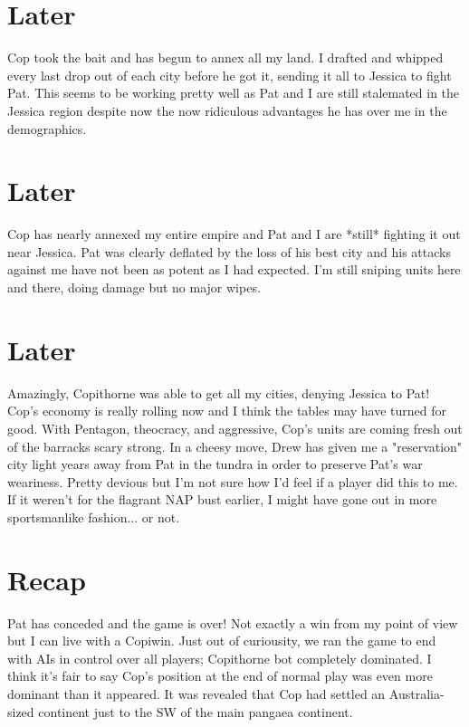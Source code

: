 \documentclass[10pt]{article}
\begin{document}
\section*{Later}

Cop took the bait and has begun to annex all my land. I drafted and
whipped every last drop out of each city before he got it, sending it
all to Jessica to fight Pat. This seems to be working pretty well as
Pat and I are still stalemated in the Jessica region despite now the
now ridiculous advantages he has over me in the demographics.

\section*{Later}

Cop has nearly annexed my entire empire and Pat and I are *still*
fighting it out near Jessica. Pat was clearly deflated by the loss of
his best city and his attacks against me have not been as potent as I
had expected. I'm still sniping units here and there, doing damage but no
major wipes.

\section*{Later}

Amazingly, Copithorne was able to get all my cities, denying Jessica
to Pat! Cop's economy is really rolling now and I think the tables may
have turned for good. With Pentagon, theocracy, and aggressive, Cop's
units are coming fresh out of the barracks scary strong. In a cheesy
move, Drew has given me a "reservation" city light years away from Pat
in the tundra in order to preserve Pat's war weariness. Pretty devious
but I'm not sure how I'd feel if a player did this to me. If it
weren't for the flagrant NAP bust earlier, I might have gone out in
more sportsmanlike fashion... or not.

\section*{Recap}

Pat has conceded and the game is over! Not exactly a win from my point
of view but I can live with a Copiwin. Just out of curiousity, we ran
the game to end with AIs in control over all players; Copithorne bot
completely dominated. I think it's fair to say Cop's position at the
end of normal play was even more dominant than it appeared. It was
revealed that Cop had settled an Australia-sized continent just to the
SW of the main pangaea continent.
\end{document}
